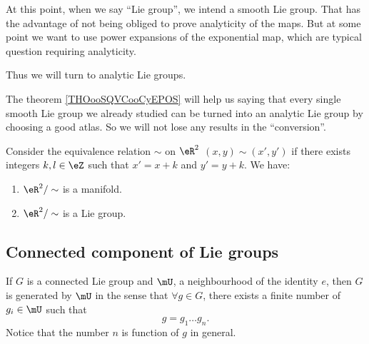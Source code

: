 \begin{normaltext}
    At this point, when we say ``Lie group'', we intend a smooth Lie group. That has the advantage of not being obliged to prove analyticity of the maps. But at some point we want to use power expansions of the exponential map, which are typical question requiring analyticity.

    Thus we will turn to analytic Lie groups.

    The theorem \ref{THOooSQVCooCyEPOS} will help us saying that every single smooth Lie group we already studied can be turned into an analytic Lie group by choosing a good atlas. So we will not lose any results in the ``conversion''.
\end{normaltext}

\begin{proposition}[\( 2\)-torus]       \label{PROPooSBVCooOZnszF}
    Consider the equivalence relation \( \sim\) on \( \eR^2\) \( (x,y)\sim(x',y')\) if there exists integers \( k,l\in \eZ\) such that \( x'=x+k\) and \( y'=y+k\). We have:
    \begin{enumerate}
        \item
            \( \eR^2/\sim\) is a manifold.
        \item
            \( \eR^2/\sim\) is a Lie group.
    \end{enumerate}
\end{proposition}
\subsection{Connected component of Lie groups}

\begin{proposition}		\label{PropUssGpGenere} 
If $G$ is a connected Lie group and $\mU$, a neighbourhood of the identity $e$, then $G$ is generated by $\mU$ in the sense that $\forall g\in G$, there exists a finite number of $g_{i}\in \mU$ such that
\begin{equation}
    g=g_1\ldots g_n.
\end{equation}
Notice that the number $n$ is function of $g$ in general.
\end{proposition}

